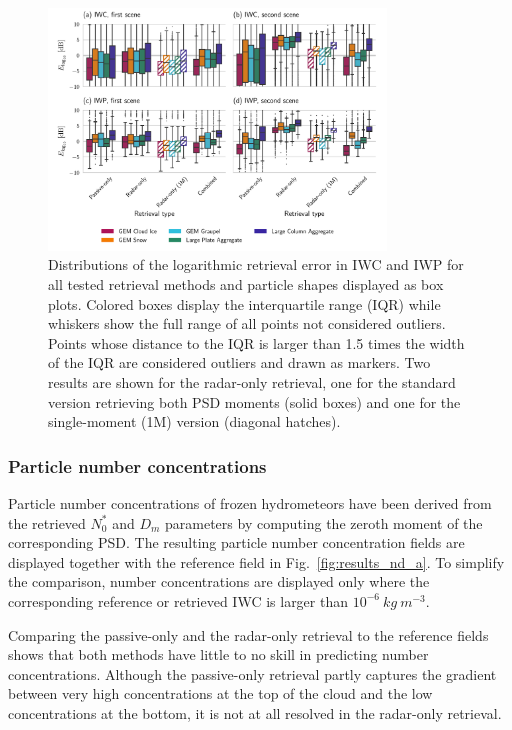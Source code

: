 \documentclass[journal abbreviation, manuscript]{copernicus}
\begin{document}
\begin{figure}[!h]
\centering \includegraphics[width = 0.8\textwidth]{../plots/results_box}
\caption{Distributions of the logarithmic retrieval error in IWC and IWP for all
  tested retrieval methods and particle shapes displayed as box plots. Colored
  boxes display the interquartile range (IQR) while whiskers show the full range of
  all points not considered outliers. Points whose distance to the IQR is larger
  than 1.5 times the width of the IQR are considered outliers and drawn as
  markers. Two results are shown for the radar-only retrieval, one for the
  standard version retrieving both PSD moments (solid boxes) and one for the
  single-moment (1M) version (diagonal hatches).}
\label{fig:boxes}
\end{figure}

\subsubsection{Particle number concentrations}

Particle number concentrations of frozen hydrometeors have been derived from the
retrieved $N_0^*$ and $D_m$ parameters by computing the zeroth moment of the
corresponding PSD. The resulting particle number concentration fields are displayed
together with the reference field in Fig.~\ref{fig:results_nd_a}. To simplify
the comparison, number concentrations are displayed only where the corresponding
reference or retrieved IWC is larger than $10^{-6}\ \unit{kg\ m^{-3}}$.

Comparing the passive-only and the radar-only retrieval to the reference fields
shows that both methods have little to no skill in predicting number 
concentrations. Although the passive-only retrieval partly captures the gradient
between very high concentrations at the top of the cloud and the low
concentrations at the bottom, it is not at all resolved in the radar-only
retrieval.
\end{document}
